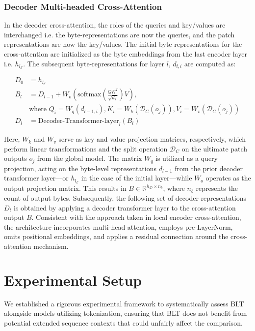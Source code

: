 \subsubsection{Decoder Multi-headed Cross-Attention} 

In the decoder cross-attention, the roles of the queries and key/values are interchanged i.e. the byte-representations are now the queries, and the patch representations are now the key/values. The initial byte-representations for the cross-attention are initialized as the byte embeddings from the last encoder layer i.e. $h_{l_{\mathcal{E}}}$. The subsequent byte-representations for layer $l$, $d_{l,i}$ are computed as:

\begin{align}
D_0 &= h_{l_{\mathcal{E}}} \\
B_l &= D_{l-1} + W_o\left(\text{softmax}\left(\frac{QK^T}{\sqrt{d_k}}\right)V\right), \\
  &\text{where } Q_i = W_q(d_{l-1,i}), K_i = W_k(\mathcal{D}_C(o_j)), V_i = W_v(\mathcal{D}_C(o_j)) \\
  D_l &= \text{Decoder-Transformer-layer}_l(B_l)
\end{align}

Here, $W_k$ and $W_v$ serve as key and value projection matrices, respectively, which perform linear transformations and the split operation $\mathcal{D}_C$ on the ultimate patch outputs $o_j$ from the global model. The matrix $W_q$ is utilized as a query projection, acting on the byte-level representations $d_{l-1}$ from the prior decoder transformer layer—or $h_{l_{\mathcal{E}}}$ in the case of the initial layer—while $W_o$ operates as the output projection matrix. This results in $B \in \mathbb{R}^{h_{\mathcal{D}} \times n_b}$, where $n_b$ represents the count of output bytes. Subsequently, the following set of decoder representations $D_l$ is obtained by applying a decoder transformer layer to the cross-attention output $B$. Consistent with the approach taken in local encoder cross-attention, the architecture incorporates multi-head attention, employs pre-LayerNorm, omits positional embeddings, and applies a residual connection around the cross-attention mechanism.

\section{Experimental Setup}
\label{section:experiments}
We established a rigorous experimental framework to systematically assess {\textsc BLT} alongside models utilizing tokenization, ensuring that {\textsc BLT} does not benefit from potential extended sequence contexts that could unfairly affect the comparison.

